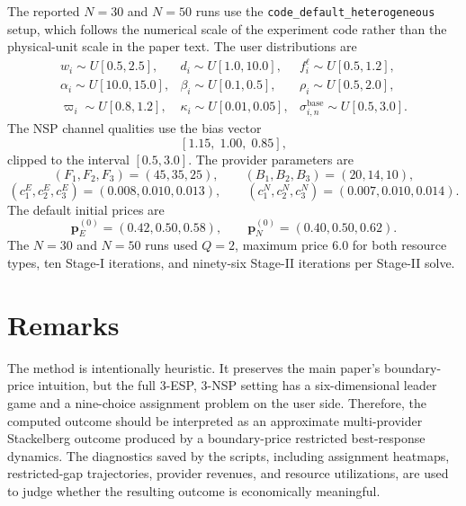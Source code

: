 \documentclass[11pt]{article}
\begin{document}
The reported \(N=30\) and \(N=50\) runs use the
\texttt{code\_default\_heterogeneous} setup, which follows the numerical scale
of the experiment code rather than the physical-unit scale in the paper text.
The user distributions are
\[
\begin{array}{lll}
w_i\sim U[0.5,2.5], & d_i\sim U[1.0,10.0], &
f_i^\ell\sim U[0.5,1.2],\\
\alpha_i\sim U[10.0,15.0], &
\beta_i\sim U[0.1,0.5], &
\rho_i\sim U[0.5,2.0],\\
\varpi_i\sim U[0.8,1.2], &
\kappa_i\sim U[0.01,0.05], &
\sigma^{\mathrm{base}}_{i,n}\sim U[0.5,3.0].
\end{array}
\]
The NSP channel qualities use the bias vector
\[
    [1.15,\;1.00,\;0.85],
\]
clipped to the interval \([0.5,3.0]\).  The provider parameters are
\[
    (F_1,F_2,F_3)=(45,35,25),
    \qquad
    (B_1,B_2,B_3)=(20,14,10),
\]
\[
    (c^E_1,c^E_2,c^E_3)=(0.008,0.010,0.013),
    \qquad
    (c^N_1,c^N_2,c^N_3)=(0.007,0.010,0.014).
\]
The default initial prices are
\[
    \boldsymbol p_E^{(0)}=(0.42,0.50,0.58),
    \qquad
    \boldsymbol p_N^{(0)}=(0.40,0.50,0.62).
\]
The \(N=30\) and \(N=50\) runs used \(Q=2\), maximum price \(6.0\) for both
resource types, ten Stage-I iterations, and ninety-six Stage-II iterations per
Stage-II solve.

\section{Remarks}

The method is intentionally heuristic.  It preserves the main paper's
boundary-price intuition, but the full 3-ESP, 3-NSP setting has a
six-dimensional leader game and a nine-choice assignment problem on the user
side.  Therefore, the computed outcome should be interpreted as an approximate
multi-provider Stackelberg outcome produced by a boundary-price restricted
best-response dynamics.  The diagnostics saved by the scripts, including
assignment heatmaps, restricted-gap trajectories, provider revenues, and
resource utilizations, are used to judge whether the resulting outcome is
economically meaningful.
\end{document}
